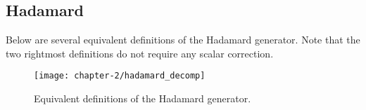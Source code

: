 \subsection{Hadamard}%
\label{appendix-hadamard}

Below are several equivalent definitions of the Hadamard generator. Note that the two rightmost definitions do not require any scalar correction.

\begin{figure}[H]
\centering
    \centering
    \texttt{[image: chapter-2/hadamard\_decomp]}
    \caption{Equivalent definitions of the Hadamard generator.}
\end{figure}




